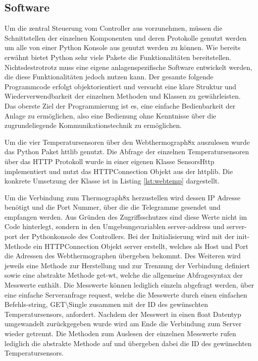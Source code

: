 \subsection{Software}

Um die zentral Steuerung vom Controller aus vorzunehmen, müssen die Schnittstellen der einzelnen Komponenten und deren Protokolle genutzt werden um alle von einer Python Konsole aus genutzt werden zu können. Wie bereits erwähnt bietet Python sehr viele Pakete die Funktionalitäten bereitstellen. Nichtsdestrotrotz muss eine eigene anlagenspezifische Software entwickelt werden, die diese Funktionalitäten jedoch nutzen kann. Der gesamte folgende Programmcode erfolgt objektorientiert und versucht eine klare Struktur und Wiederverwendbarkeit der einzelnen Methoden und Klassen zu gewährleisten. Das oberste Ziel der Programmierung ist es, eine einfache Bedienbarkeit der Anlage zu ermöglichen, also eine Bedienung ohne Kenntnisse über die zugrundeliegende Kommunikationstechnik zu ermöglichen.

Um die vier Temperatursensoren über den Webthermograph8x auszulesen wurde das Python Paket httlib genutzt. Die Abfrage der einzelnen Temperatursensoren über das HTTP Protokoll wurde in einer eigenen Klasse SensorsHttp implementiert und nutzt das HTTPConnection Objekt aus der httplib. Die konkrete Umsetzung der Klasse ist in Listing \ref{lst:webtemp} dargestellt.

Um die Verbindung zum Thermograph8x herzustellen wird dessen IP Adresse benötigt und die Port Nummer, über die die Telegramme gesendet und empfangen werden. Aus Gründen des Zugriffsschutzes sind diese Werte nicht im Code hinterlegt, sondern in den Umgebungsvariablen server-address und server-port der Pythonkonsole des Controllers.
Bei der Initialisierung wird mit der init-Methode ein HTTPConnection Objekt server erstellt, welches als Host und Port die Adressen des Webthermographen übergeben bekommt.
Des Weiteren wird jeweils eine Methode zur Herstellung und zur Trennung der Verbindung definiert sowie eine abstrakte Methode get-wt, welche die allgemeine Abfragesyntax der Messwerte enthält. Die Messwerte können lediglich einzeln abgefragt werden, über eine einfache Serveranfrage request, welche die Messwerte durch einen einfachen Befehls-string, \Gun GET\textbackslash Single \Gob zusammen mit der ID des gewünschten Temperatursensors, anfordert. Nachdem der Messwert in einen float Datentyp umgewandelt zurückgegeben wurde wird am Ende die Verbindung zum Server wieder getrennt. Die Methoden zum Auslesen der einzelnen Messwerte rufen lediglich die abstrakte Methode auf und übergeben dabei die ID des gewünschten Temperatursensors.

